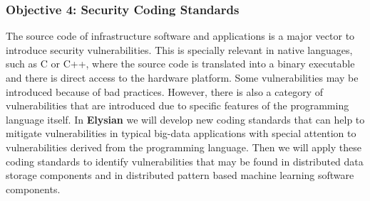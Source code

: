\documentclass[a4paper,11pt]{article}
\newcommand{\project}[1]{\textbf{#1}\xspace}
\newcommand{\SECURITY}{\project{Elysian}}
\newcommand{\TheProject}{\SECURITY}
\begin{document}

\subsubsection*{Objective 4: Security Coding Standards}
The source code of infrastructure software and applications is a major vector to introduce security vulnerabilities. This is specially relevant in native languages, such as C or C++, where the source code is translated into a binary executable and there is direct access to the hardware platform. Some vulnerabilities may be introduced because of bad practices. However, there is also a category of vulnerabilities that are introduced due to specific features of the programming language itself.
In \TheProject{} we will develop new coding standards that can help to mitigate vulnerabilities in typical big-data applications with special attention to vulnerabilities derived from  the programming language. Then we will apply these coding standards to identify vulnerabilities that may be found in distributed data storage components and in distributed pattern based machine learning software components.
\end{document}
